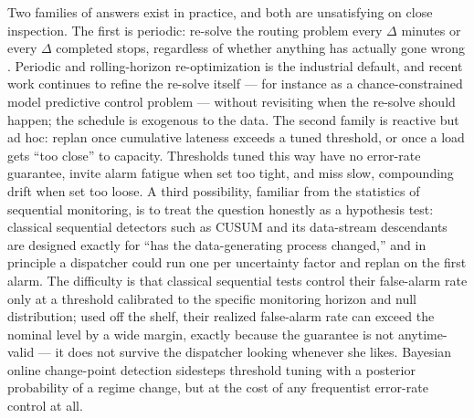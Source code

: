 \documentclass[trsc,dblanonrev]{informs4}
\begin{document}
Two families of answers exist in practice, and both are unsatisfying
on close inspection. The first is periodic: re-solve the routing
problem every $\Delta$ minutes or every $\Delta$ completed stops,
regardless of whether anything has actually gone wrong
\citep{pillac2013review}. Periodic and rolling-horizon re-optimization
is the industrial default, and recent work continues to refine the
re-solve itself --- for instance as a chance-constrained model
predictive control problem \citep{he2026smpc} --- without revisiting
when the re-solve should happen; the schedule is exogenous to the
data. The second family is reactive but ad hoc: replan once cumulative
lateness exceeds a tuned threshold, or once a load gets ``too close''
to capacity. Thresholds tuned this way have no error-rate guarantee,
invite alarm fatigue when set too tight, and miss slow, compounding
drift when set too loose. A third possibility, familiar from the
statistics of sequential monitoring, is to treat the question honestly
as a hypothesis test: classical sequential detectors such as CUSUM
\citep{page1954} and its data-stream descendants
\citep{gama2014survey} are designed exactly for ``has the
data-generating process changed,'' and in principle a dispatcher could
run one per uncertainty factor and replan on the first alarm. The
difficulty is that classical sequential tests control their false-alarm
rate only at a threshold calibrated to the specific monitoring horizon
and null distribution; used off the shelf, their realized false-alarm
rate can exceed the nominal level by a wide margin, exactly because the
guarantee is not anytime-valid --- it does not survive the dispatcher
looking whenever she likes. Bayesian online change-point detection
\citep{adams2007bayesian} sidesteps threshold tuning with a posterior
probability of a regime change, but at the cost of any frequentist
error-rate control at all.
\end{document}
